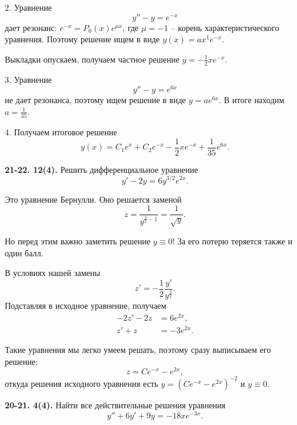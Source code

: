 2. Уравнение
\begin{equation*}
    y'' - y = e^{-x}
\end{equation*}
дает резонанс: $e^{-x} = P_0(x)e^{\mu x}$, где $\mu = -1$ -- корень характеристического уравнения. Поэтому решение ищем в виде $y(x) = ax^1e^{-x}$.

Выкладки опускаем, получаем частное решение $y = -\frac{1}{2}xe^{-x}$.

3. Уравнение
\begin{equation*}
    y'' - y = e^{6x}
\end{equation*}
не дает резонанса, поэтому ищем решение в виде $y = ae^{6x}$. В итоге находим $a = \frac{1}{35}$.

4. Получаем итоговое решение
\begin{equation*}
    y(x) = C_1e^x + C_2e^{-x} - \frac 12 xe^{-x} + \frac 1 {35} e^{6x}.
\end{equation*}

\begin{task}
    \textbf{21-22. 12(4).} Решить дифференциальное уравнение
    \begin{equation*}
        y' - 2y = 6y^{3/2}e^{2x}.
    \end{equation*}
\end{task}
Это уравнение Бернулли. Оно решается заменой
\begin{equation*}
    z = \frac{1}{y^{\frac 32 - 1}} = \frac{1}{\sqrt{y}}.
\end{equation*}

Но перед этим важно заметить решение $y \equiv 0$! За его потерю теряется также и один балл.

В условиях нашей замены
\begin{equation*}
    z' = -\frac 12 \frac{y'}{y^{\frac 32}}.
\end{equation*}
Подставляя в исходное уравнение, получаем
\begin{align*}
    -2z' - 2z &= 6e^{2x}, \\
    z' + z &= -3e^{2x}.
\end{align*}

Такие уравнения мы легко умеем решать, поэтому сразу выписываем его решение:
\begin{equation*}
    z = Ce^{-x} - e^{2x},
\end{equation*}
откуда решения исходного уравнения есть $y = (Ce^{-x} - e^{2x})^{-2}$ и $y \equiv 0$.

\begin{task}
    \textbf{20-21. 4(4).} Найти все действительные решения уравнения
    \begin{equation*}
        y'' + 6y' + 9y = -18xe^{-3x}.
    \end{equation*}
\end{task}

